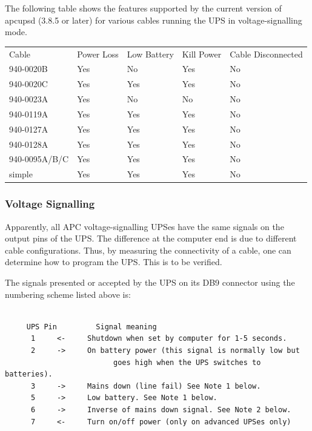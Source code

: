 {{{{{{{{{{The following table shows the features supported by the current version of
apcupsd (3.8.5 or later) for various cables running the UPS in
voltage-signalling mode.  

\begin{longtable}{lllll}
{Cable} & {Power Loss} & {Low Battery} & {Kill Power} & {Cable Disconnected 
 } \\
{940-0020B} & {Yes} & {No} & {Yes} & {No 
 } \\
{940-0020C} & {Yes} & {Yes} & {Yes} & {No 
 } \\
{940-0023A} & {Yes} & {No} & {No} & {No 
 } \\
{940-0119A} & {Yes} & {Yes} & {Yes} & {No 
 } \\
{940-0127A} & {Yes} & {Yes} & {Yes} & {No 
 } \\
{940-0128A} & {Yes} & {Yes} & {Yes} & {No 
 } \\
{940-0095A/B/C} & {Yes} & {Yes} & {Yes} & {No 
 } \\
{simple} & {Yes} & {Yes} & {Yes} & {No  
}

\end{longtable}

\label{Voltage-Signalling}

\subsubsection*{Voltage Signalling}

\label{index-Voltage-Signalling_002c-Cables-198}
\label{index-Cables_002c-Voltage-Signalling-199}
Apparently, all APC voltage-signalling UPSes have the same signals on the
output pins of the UPS. The difference at the computer end is due to different
cable configurations. Thus, by measuring the connectivity of a cable, one can
determine how to program the UPS. This is to be verified.  

The signals presented or accepted by the UPS on its DB9 connector using the
numbering scheme listed above is: 

\footnotesize
\begin{verbatim}
     
     UPS Pin         Signal meaning
      1     <-     Shutdown when set by computer for 1-5 seconds.
      2     ->     On battery power (this signal is normally low but
                         goes high when the UPS switches to batteries).
      3     ->     Mains down (line fail) See Note 1 below.
      5     ->     Low battery. See Note 1 below.
      6     ->     Inverse of mains down signal. See Note 2 below.
      7     <-     Turn on/off power (only on advanced UPSes only)
     

\end{verbatim}}}}}}}}}}}
